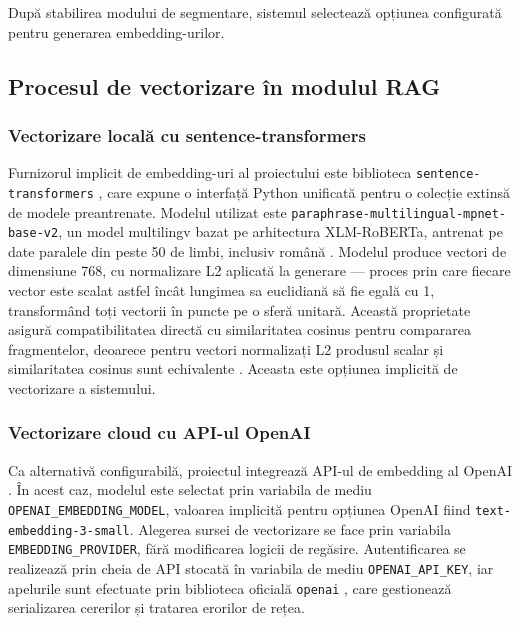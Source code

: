 \documentclass[12pt, a4paper, oneside, romanian]{teza-upb}
\begin{document}
După stabilirea modului de segmentare, sistemul selectează opțiunea configurată pentru generarea embedding-urilor.

\subsection{Procesul de vectorizare în modulul RAG}

\subsubsection{Vectorizare locală cu sentence-transformers}

Furnizorul implicit de 
embedding-uri al proiectului este biblioteca \texttt{sentence-transformers} 
\cite{sentence_transformers_doc}, care expune o interfață Python unificată pentru 
o colecție extinsă de modele preantrenate. Modelul utilizat este 
\texttt{paraphrase-multilingual-mpnet-base-v2}, un model multilingv bazat pe 
arhitectura XLM-RoBERTa, antrenat pe date paralele din peste 50 de limbi, 
inclusiv română \cite{paraphrase_multilingual_mpnet}. Modelul produce vectori de dimensiune 768, cu normalizare L2 aplicată la 
generare — proces prin care fiecare vector este scalat astfel încât lungimea 
sa euclidiană să fie egală cu 1, transformând toți vectorii în puncte pe o 
sferă unitară. Această proprietate asigură compatibilitatea directă cu 
similaritatea cosinus pentru compararea fragmentelor, deoarece pentru vectori 
normalizați L2 produsul scalar și similaritatea cosinus sunt echivalente 
\cite{paraphrase_multilingual_mpnet}. Aceasta este opțiunea implicită de vectorizare a sistemului.

\subsubsection{Vectorizare cloud cu API-ul OpenAI}

Ca alternativă configurabilă, proiectul integrează API-ul de embedding al OpenAI \cite{openai_embeddings}. În acest caz, modelul este selectat prin variabila de mediu \texttt{OPENAI\_EMBEDDING\_MODEL}, valoarea implicită pentru opțiunea OpenAI fiind \texttt{text-embedding-3-small}. Alegerea sursei de vectorizare se face prin variabila \texttt{EMBEDDING\_PROVIDER}, fără modificarea logicii de regăsire. Autentificarea se realizează prin cheia de API stocată în variabila de mediu \texttt{OPENAI\_API\_KEY}, iar apelurile sunt efectuate prin biblioteca oficială \texttt{openai} \cite{openai_api}, care gestionează serializarea cererilor și tratarea erorilor de rețea.
\end{document}

